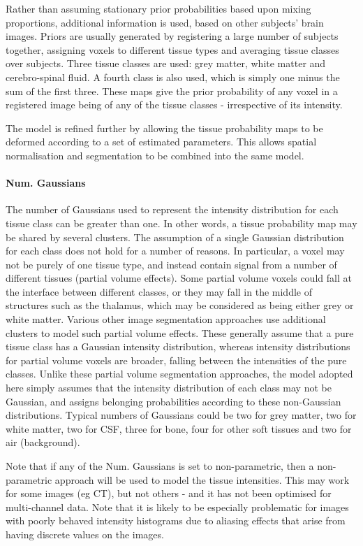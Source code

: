 Rather than assuming stationary prior probabilities based upon mixing proportions, additional information is used, based on other subjects' brain images.  Priors are usually generated by registering a large number of subjects together, assigning voxels to different tissue types and averaging tissue classes over subjects. Three tissue classes are used: grey matter, white matter and cerebro-spinal fluid. A fourth class is also used, which is simply one minus the sum of the first three. These maps give the prior probability of any voxel in a registered image being of any of the tissue classes - irrespective of its intensity.



The model is refined further by allowing the tissue probability maps to be deformed according to a set of estimated parameters. This allows spatial normalisation and segmentation to be combined into the same model.


\paragraph{Num. Gaussians}
The number of Gaussians used to represent the intensity distribution for each tissue class can be greater than one. In other words, a tissue probability map may be shared by several clusters. The assumption of a single Gaussian distribution for each class does not hold for a number of reasons. In particular, a voxel may not be purely of one tissue type, and instead contain signal from a number of different tissues (partial volume effects). Some partial volume voxels could fall at the interface between different classes, or they may fall in the middle of structures such as the thalamus, which may be considered as being either grey or white matter. Various other image segmentation approaches use additional clusters to model such partial volume effects. These generally assume that a pure tissue class has a Gaussian intensity distribution, whereas intensity distributions for partial volume voxels are broader, falling between the intensities of the pure classes. Unlike these partial volume segmentation approaches, the model adopted here simply assumes that the intensity distribution of each class may not be Gaussian, and assigns belonging probabilities according to these non-Gaussian distributions. Typical numbers of Gaussians could be two for grey matter, two for white matter, two for CSF, three for bone, four for other soft tissues and two for air (background).

Note that if any of the Num. Gaussians is set to non-parametric, then a non-parametric approach will be used to model the tissue intensities. This may work for some images (eg CT), but not others - and it has not been optimised for multi-channel data. Note that it is likely to be especially problematic for images with poorly behaved intensity histograms due to aliasing effects that arise from having discrete values on the images.


